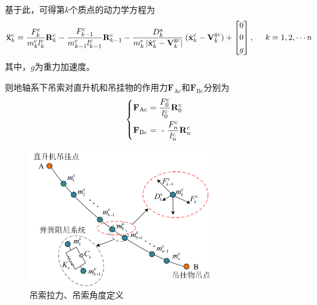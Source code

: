 基于此，可得第$k$个质点的动力学方程为
\begin{equation}
  {\mathbf{\ddot x}}_k^{\text{c}} = \frac{{F_k^{\text{c}}}}{{m_k^{\text{c}}l_k^{\text{c}}}}{\mathbf{R}}_k^{\text{c}} - \frac{{F_{k - 1}^{\text{c}}}}{{m_{k - 1}^{\text{c}}l_{k - 1}^{\text{c}}}}{\mathbf{R}}_{k - 1}^{\text{c}} - \frac{{D_k^{\text{a}}}}{{m_k^{\text{c}}\left| {\dot {\mathbf{x}}_k^{\text{c}} - {\mathbf{V}}_k^{{\text{gc}}}} \right|}}\left( {\dot {\mathbf{x}}_k^{\text{c}} - {\mathbf{V}}_k^{{\text{gc}}}} \right) + \left[ \begin{gathered}
    0 \hfill \\
    0 \hfill \\
    g \hfill \\ 
  \end{gathered}  \right],\;\;\;\;\;k = 1,2, \cdots n
\end{equation}
其中，$g$为重力加速度。

则地轴系下吊索对直升机和吊挂物的作用力$\mathbf{F}_{\text{Ac}}$和$\mathbf{F}_{\text{Bc}}$分别为
\begin{equation}
  \left\{ \begin{gathered}
    {{\mathbf{F}}_{{\text{Ac}}}} = \frac{{F_0^{\text{c}}}}{{l_0^{\text{c}}}}{\mathbf{R}}_0^c \hfill \\
    {{\mathbf{F}}_{{\text{Bc}}}} = {\text{ - }}\frac{{F_n^{\text{c}}}}{{l_n^{\text{c}}}}{\mathbf{R}}_n^c \hfill \\ 
  \end{gathered}  \right.
\end{equation}

\begin{figure}
  \includegraphics[width=8cm]{fig/figure_chap2/chap_2_4_2_1.png}
  \caption{吊索拉力、吊索角度定义}
  \label{fig:chap_2_4_2_1}
\end{figure}

